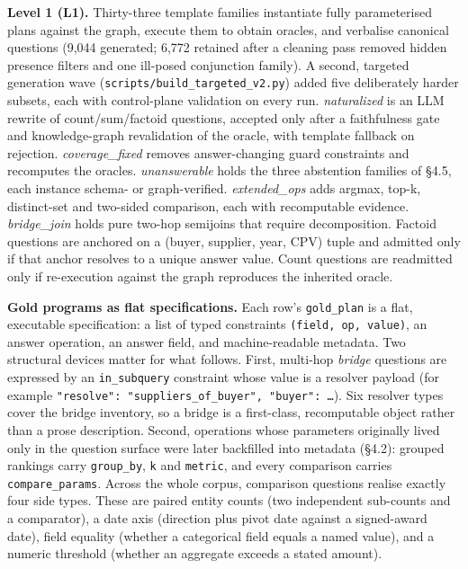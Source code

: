 \textbf{Level 1 (L1).} Thirty-three template families instantiate fully parameterised plans against the graph, execute them to obtain oracles, and verbalise canonical questions (9,044 generated; 6,772 retained after a cleaning pass removed hidden presence filters and one ill-posed conjunction family). A second, targeted generation wave (\texttt{scripts/build\_targeted\_v2.py}) added five deliberately harder subsets, each with control-plane validation on every run. \emph{naturalized} is an LLM rewrite of count/sum/factoid questions, accepted only after a faithfulness gate and knowledge-graph revalidation of the oracle, with template fallback on rejection. \emph{coverage\_fixed} removes answer-changing guard constraints and recomputes the oracles. \emph{unanswerable} holds the three abstention families of §4.5, each instance schema- or graph-verified. \emph{extended\_ops} adds argmax, top-k, distinct-set and two-sided comparison, each with recomputable evidence. \emph{bridge\_join} holds pure two-hop semijoins that require decomposition. Factoid questions are anchored on a (buyer, supplier, year, CPV) tuple and admitted only if that anchor resolves to a unique answer value. Count questions are readmitted only if re-execution against the graph reproduces the inherited oracle.

\textbf{Gold programs as flat specifications.} Each row's \texttt{gold\_plan} is a flat, executable specification: a list of typed constraints \texttt{(field, op, value)}, an answer operation, an answer field, and machine-readable metadata. Two structural devices matter for what follows. First, multi-hop \emph{bridge} questions are expressed by an \texttt{in\_subquery} constraint whose value is a resolver payload (for example \texttt{{"resolve": "suppliers\_of\_buyer", "buyer": …}}). Six resolver types cover the bridge inventory, so a bridge is a first-class, recomputable object rather than a prose description. Second, operations whose parameters originally lived only in the question surface were later backfilled into metadata (§4.2): grouped rankings carry \texttt{group\_by}, \texttt{k} and \texttt{metric}, and every comparison carries \texttt{compare\_params}. Across the whole corpus, comparison questions realise exactly four side types. These are paired entity counts (two independent sub-counts and a comparator), a date axis (direction plus pivot date against a signed-award date), field equality (whether a categorical field equals a named value), and a numeric threshold (whether an aggregate exceeds a stated amount).

